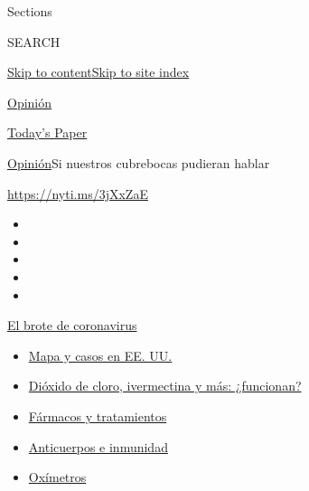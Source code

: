 Sections

SEARCH

\protect\hyperlink{site-content}{Skip to
content}\protect\hyperlink{site-index}{Skip to site index}

\href{https://www.nytimes.com/es/section/opinion}{Opinión}

\href{https://myaccount.nytimes.com/auth/login?response_type=cookie\&client_id=vi}{}

\href{https://www.nytimes.com/section/todayspaper}{Today's Paper}

\href{/es/section/opinion}{Opinión}\textbar{}Si nuestros cubrebocas
pudieran hablar

\url{https://nyti.ms/3jXxZaE}

\begin{itemize}
\item
\item
\item
\item
\item
\end{itemize}

\href{https://www.nytimes.com/es/spotlight/coronavirus?action=click\&pgtype=Article\&state=default\&region=TOP_BANNER\&context=storylines_menu}{El
brote de coronavirus}

\begin{itemize}
\tightlist
\item
  \href{https://www.nytimes.com/es/interactive/2020/espanol/mundo/coronavirus-en-estados-unidos.html?action=click\&pgtype=Article\&state=default\&region=TOP_BANNER\&context=storylines_menu}{Mapa
  y casos en EE. UU.}
\item
  \href{https://www.nytimes.com/es/2020/07/23/espanol/america-latina/bolivia-cloro-coronavirus-ivermectina.html?action=click\&pgtype=Article\&state=default\&region=TOP_BANNER\&context=storylines_menu}{Dióxido
  de cloro, ivermectina y más: ¿funcionan?}
\item
  \href{https://www.nytimes.com/es/interactive/2020/science/coronavirus-tratamientos-curas.html?action=click\&pgtype=Article\&state=default\&region=TOP_BANNER\&context=storylines_menu}{Fármacos
  y tratamientos}
\item
  \href{https://www.nytimes.com/es/2020/07/28/espanol/ciencia-y-tecnologia/anticuerpos-coronavirus-inmunidad.html?action=click\&pgtype=Article\&state=default\&region=TOP_BANNER\&context=storylines_menu}{Anticuerpos
  e inmunidad}
\item
  \href{https://www.nytimes.com/es/2020/04/29/espanol/estilos-de-vida/oximetro-para-que-sirve.html?action=click\&pgtype=Article\&state=default\&region=TOP_BANNER\&context=storylines_menu}{Oxímetros}
\end{itemize}

